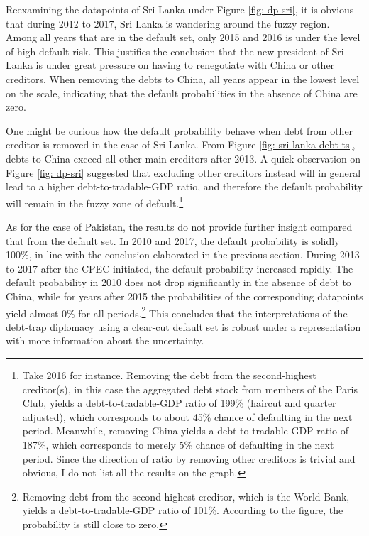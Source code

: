 Reexamining the datapoints of Sri Lanka under Figure \ref{fig: dp-sri}, it is obvious that during 2012 to 2017, Sri Lanka is wandering around the fuzzy region. Among all years that are in the default set, only 2015 and 2016 is under the level of high default risk. This justifies the conclusion that the new president of Sri Lanka is under great pressure on having to renegotiate with China or other creditors. When removing the debts to China, all years appear in the lowest level on the scale, indicating that the default probabilities in the absence of China are zero.

One might be curious how the default probability behave when debt from other creditor is removed in the case of Sri Lanka. From Figure \ref{fig: sri-lanka-debt-ts}, debts to China exceed all other main creditors after 2013. A quick observation on Figure \ref{fig: dp-sri} suggested that excluding other creditors instead will in general lead to a higher debt-to-tradable-GDP ratio, and therefore the default probability will remain in the fuzzy zone of default.\footnote{%
    Take 2016 for instance. Removing the debt from the second-highest creditor(s), in this case the aggregated debt stock from members of the Paris Club, yields a debt-to-tradable-GDP ratio of 199\% (haircut and quarter adjusted), which corresponds to about 45\% chance of defaulting in the next period. Meanwhile, removing China yields a debt-to-tradable-GDP ratio of 187\%, which corresponds to merely 5\% chance of defaulting in the next period. Since the direction of ratio by removing other creditors is trivial and obvious, I do not list all the results on the graph.
}

As for the case of Pakistan, the results do not provide further insight compared that from the default set. In 2010 and 2017, the default probability is solidly 100\%, in-line with the conclusion elaborated in the previous section. During 2013 to 2017 after the CPEC initiated, the default probability increased rapidly. The default probability in 2010 does not drop significantly in the absence of debt to China, while for years after 2015 the probabilities of the corresponding datapoints yield almost 0\% for all periods.\footnote{%
    Removing debt from the second-highest creditor, which is the World Bank, yields a debt-to-tradable-GDP ratio of 101\%. According to the figure, the probability is still close to zero.
}
This concludes that the interpretations of the debt-trap diplomacy using a clear-cut default set is robust under a representation with more information about the uncertainty.
